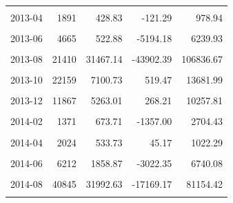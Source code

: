 \begin{longtable}[t]{crrrr}
\cellcolor{gray!10}{2013-03} & \cellcolor{gray!10}{2283} & \cellcolor{gray!10}{723.59} & \cellcolor{gray!10}{-136.84} & \cellcolor{gray!10}{1584.03}\\
2013-04 & 1891 & 428.83 & -121.29 & 978.94\\
\cellcolor{gray!10}{2013-05} & \cellcolor{gray!10}{2844} & \cellcolor{gray!10}{223.73} & \cellcolor{gray!10}{-1526.29} & \cellcolor{gray!10}{1973.75}\\
2013-06 & 4665 & 522.88 & -5194.18 & 6239.93\\
\cellcolor{gray!10}{2013-07} & \cellcolor{gray!10}{8794} & \cellcolor{gray!10}{1915.73} & \cellcolor{gray!10}{-7060.62} & \cellcolor{gray!10}{10892.07}\\
2013-08 & 21410 & 31467.14 & -43902.39 & 106836.67\\
\cellcolor{gray!10}{2013-09} & \cellcolor{gray!10}{36019} & \cellcolor{gray!10}{17402.45} & \cellcolor{gray!10}{-23725.04} & \cellcolor{gray!10}{58529.93}\\
2013-10 & 22159 & 7100.73 & 519.47 & 13681.99\\
\cellcolor{gray!10}{2013-11} & \cellcolor{gray!10}{11954} & \cellcolor{gray!10}{3046.28} & \cellcolor{gray!10}{-27533.25} & \cellcolor{gray!10}{33625.82}\\
2013-12 & 11867 & 5263.01 & 268.21 & 10257.81\\
\cellcolor{gray!10}{2014-01} & \cellcolor{gray!10}{3044} & \cellcolor{gray!10}{1138.15} & \cellcolor{gray!10}{-177.19} & \cellcolor{gray!10}{2453.48}\\
2014-02 & 1371 & 673.71 & -1357.00 & 2704.43\\
\cellcolor{gray!10}{2014-03} & \cellcolor{gray!10}{1929} & \cellcolor{gray!10}{120.44} & \cellcolor{gray!10}{-1076.00} & \cellcolor{gray!10}{1316.89}\\
2014-04 & 2024 & 533.73 & 45.17 & 1022.29\\
\cellcolor{gray!10}{2014-05} & \cellcolor{gray!10}{2931} & \cellcolor{gray!10}{315.40} & \cellcolor{gray!10}{-1383.25} & \cellcolor{gray!10}{2014.05}\\
2014-06 & 6212 & 1858.87 & -3022.35 & 6740.08\\
\cellcolor{gray!10}{2014-07} & \cellcolor{gray!10}{10529} & \cellcolor{gray!10}{3123.11} & \cellcolor{gray!10}{-4990.50} & \cellcolor{gray!10}{11236.72}\\
2014-08 & 40845 & 31992.63 & -17169.17 & 81154.42\\
\cellcolor{gray!10}{2014-09} & \cellcolor{gray!10}{42049} & \cellcolor{gray!10}{21266.61} & \cellcolor{gray!10}{-16094.00} & \cellcolor{gray!10}{58627.23}\\

\end{longtable}
